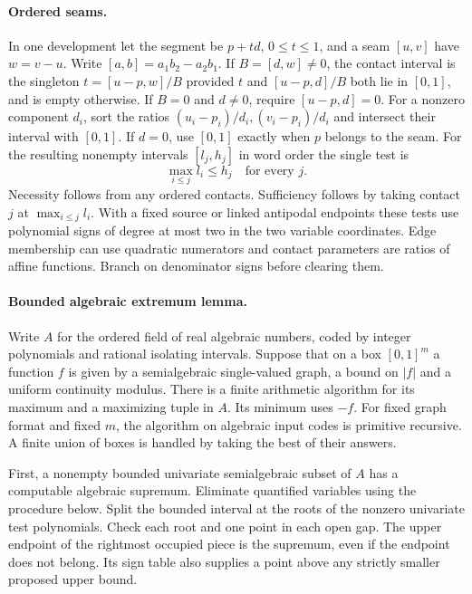 \documentclass[10pt,letterpaper]{article}
\begin{document}
\paragraph{Ordered seams.}
In one development let the segment be $p+td$, $0\le t\le1$, and a
seam $[u,v]$ have $w=v-u$. Write $[a,b]=a_1b_2-a_2b_1$. If
$B=[d,w]\ne0$, the contact interval is the singleton $t=[u-p,w]/B$
provided $t$ and $[u-p,d]/B$ both lie in $[0,1]$, and is empty
otherwise. If $B=0$ and $d\ne0$, require $[u-p,d]=0$. For a nonzero
component $d_i$, sort the ratios $(u_i-p_i)/d_i,(v_i-p_i)/d_i$ and
intersect their interval with $[0,1]$. If $d=0$, use $[0,1]$ exactly
when $p$ belongs to the seam. For the resulting nonempty intervals
$[l_j,h_j]$ in word order the single test is
\[
                 \max_{i\le j} l_i\le h_j\quad\text{for every }j .
\]
Necessity follows from any ordered contacts. Sufficiency follows by
taking contact $j$ at $\max_{i\le j}l_i$. With a fixed source or linked
antipodal endpoints these tests use polynomial signs of degree at most
two in the two variable coordinates. Edge membership can use quadratic
numerators and contact parameters are ratios of affine functions.
Branch on denominator signs before clearing them.

\paragraph{Bounded algebraic extremum lemma.}
Write $A$ for the ordered field of real algebraic numbers, coded by
integer polynomials and rational isolating intervals. Suppose that on
a box $[0,1]^m$ a function $f$ is given by a semialgebraic single-valued
graph, a bound on $|f|$ and a uniform continuity modulus. There is a
finite arithmetic algorithm for its maximum and a maximizing tuple in
$A$. Its minimum uses $-f$. For fixed graph format and fixed $m$, the
algorithm on algebraic input codes is primitive recursive. A finite
union of boxes is handled by taking the best of their answers.

First, a nonempty bounded univariate semialgebraic subset of $A$ has a
computable algebraic supremum. Eliminate quantified variables using the
procedure below. Split the bounded interval at the roots of the
nonzero univariate test polynomials. Check each root and one point in
each open gap. The upper endpoint of the rightmost occupied piece is
the supremum, even if the endpoint does not belong. Its sign table also
supplies a point above any strictly smaller proposed upper bound.
\end{document}
